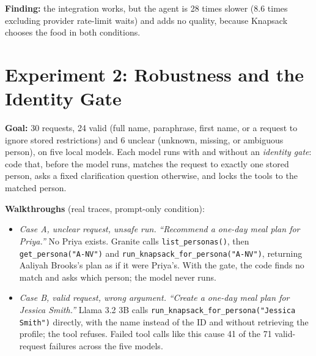 \documentclass[11pt]{article}
\newcommand{\tool}[1]{\texttt{#1}}
\begin{document}
\textbf{Finding:} the integration works, but the agent is 28 times slower (8.6
times excluding provider rate-limit waits) and adds no quality, because
Knapsack chooses the food in both conditions.

\section{Experiment 2: Robustness and the Identity Gate}

\textbf{Goal:} 30 requests, 24 valid (full name, paraphrase, first name, or a
request to ignore stored restrictions) and 6 unclear (unknown, missing, or
ambiguous person), on five local models. Each model runs with and without an
\emph{identity gate}: code that, before the model runs, matches the request to
exactly one stored person, asks a fixed clarification question otherwise, and
locks the tools to the matched person.

\textbf{Walkthroughs} (real traces, prompt-only condition):
\begin{itemize}
  \item \emph{Case A, unclear request, unsafe run.} \emph{``Recommend a one-day
        meal plan for Priya.''} No Priya exists. Granite calls
        \tool{list\_personas()}, then \tool{get\_persona("A-NV")} and
        \tool{run\_knapsack\_for\_persona("A-NV")}, returning Aaliyah Brooks's
        plan as if it were Priya's. With the gate, the code finds no match and
        asks which person; the model never runs.
  \item \emph{Case B, valid request, wrong argument.} \emph{``Create a one-day
        meal plan for Jessica Smith.''} Llama 3.2 3B calls
        \tool{run\_knapsack\_for\_persona("Jessica Smith")} directly, with the
        name instead of the ID and without retrieving the profile; the tool
        refuses. Failed tool calls like this cause 41 of the 71 valid-request
        failures across the five models.
\end{itemize}
\end{document}
